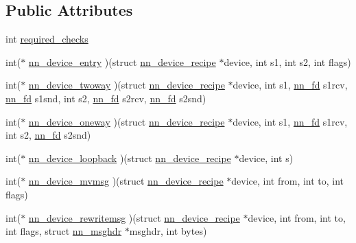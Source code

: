 \subsection*{Public Attributes}
\begin{DoxyCompactItemize}
\item 
int \hyperlink{structnn__device__recipe_a78ce62e7ab6b45a11e8dfeb5894b356e}{required\+\_\+checks}
\item 
int($\ast$ \hyperlink{structnn__device__recipe_adeb5d36621f14a9837fdc4cb94c3d051}{nn\+\_\+device\+\_\+entry} )(struct \hyperlink{structnn__device__recipe}{nn\+\_\+device\+\_\+recipe} $\ast$device, int s1, int s2, int flags)
\item 
int($\ast$ \hyperlink{structnn__device__recipe_aff9065238d098af6a963756174a4043d}{nn\+\_\+device\+\_\+twoway} )(struct \hyperlink{structnn__device__recipe}{nn\+\_\+device\+\_\+recipe} $\ast$device, int s1, \hyperlink{efd__socketpair_8h_ac7ca4a7f723a6addf724ee88951a4d02}{nn\+\_\+fd} s1rcv, \hyperlink{efd__socketpair_8h_ac7ca4a7f723a6addf724ee88951a4d02}{nn\+\_\+fd} s1snd, int s2, \hyperlink{efd__socketpair_8h_ac7ca4a7f723a6addf724ee88951a4d02}{nn\+\_\+fd} s2rcv, \hyperlink{efd__socketpair_8h_ac7ca4a7f723a6addf724ee88951a4d02}{nn\+\_\+fd} s2snd)
\item 
int($\ast$ \hyperlink{structnn__device__recipe_a2228a6409b18679d8ae17d5c230967cc}{nn\+\_\+device\+\_\+oneway} )(struct \hyperlink{structnn__device__recipe}{nn\+\_\+device\+\_\+recipe} $\ast$device, int s1, \hyperlink{efd__socketpair_8h_ac7ca4a7f723a6addf724ee88951a4d02}{nn\+\_\+fd} s1rcv, int s2, \hyperlink{efd__socketpair_8h_ac7ca4a7f723a6addf724ee88951a4d02}{nn\+\_\+fd} s2snd)
\item 
int($\ast$ \hyperlink{structnn__device__recipe_a942a556adb7a502cce98f9090a6d0ebf}{nn\+\_\+device\+\_\+loopback} )(struct \hyperlink{structnn__device__recipe}{nn\+\_\+device\+\_\+recipe} $\ast$device, int s)
\item 
int($\ast$ \hyperlink{structnn__device__recipe_aaf7ad40c45c50814de02aa920f5e8a24}{nn\+\_\+device\+\_\+mvmsg} )(struct \hyperlink{structnn__device__recipe}{nn\+\_\+device\+\_\+recipe} $\ast$device, int from, int to, int flags)
\item 
int($\ast$ \hyperlink{structnn__device__recipe_afcfda6f162ed7dd5bb98f3d796a3a6ea}{nn\+\_\+device\+\_\+rewritemsg} )(struct \hyperlink{structnn__device__recipe}{nn\+\_\+device\+\_\+recipe} $\ast$device, int from, int to, int flags, struct \hyperlink{structnn__msghdr}{nn\+\_\+msghdr} $\ast$msghdr, int bytes)
\end{DoxyCompactItemize}


